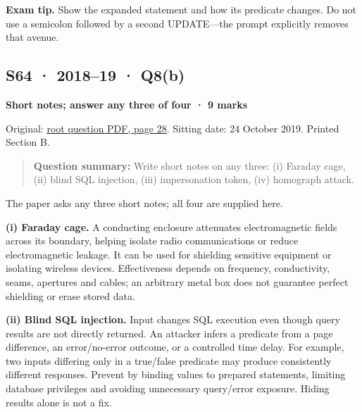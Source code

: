 \documentclass[11pt,a4paper]{article}
\begin{document}
{\color{ForestGreen}\textbf{Exam tip.} Show the expanded statement and how its predicate changes. Do not use a semicolon followed by a second UPDATE—the prompt explicitly removes that avenue.}




\clearpage
\subsection{S64 · 2018–19 · Q8(b)}\label{s64}

\textbf{Short notes; answer any three of four · 9 marks}


Original: \href{../../CSE405-Security_Merged.pdf\#page=28}{root question PDF,\allowbreak{} page 28}. Sitting date: 24 October 2019. Printed Section B.



\begin{quote}\small

\textbf{Question summary:} Write short notes on any three: (i) Faraday cage,\allowbreak{} (ii) blind SQL injection,\allowbreak{} (iii) impersonation token,\allowbreak{} (iv) homograph attack.



\end{quote}

The paper asks any three short notes; all four are supplied here.


\textbf{(i) Faraday cage.} A conducting enclosure attenuates electromagnetic fields across its boundary,\allowbreak{} helping isolate radio communications or reduce electromagnetic leakage. It can be used for shielding sensitive equipment or isolating wireless devices. Effectiveness depends on frequency,\allowbreak{} conductivity,\allowbreak{} seams,\allowbreak{} apertures and cables; an arbitrary metal box does not guarantee perfect shielding or erase stored data.


\textbf{(ii) Blind SQL injection.} Input changes SQL execution even though query results are not directly returned. An attacker infers a predicate from a page difference,\allowbreak{} an error/\allowbreak{}no-error outcome,\allowbreak{} or a controlled time delay. For example,\allowbreak{} two inputs differing only in a true/\allowbreak{}false predicate may produce consistently different responses. Prevent by binding values to prepared statements,\allowbreak{} limiting database privileges and avoiding unnecessary query/\allowbreak{}error exposure. Hiding results alone is not a fix.
\end{document}
